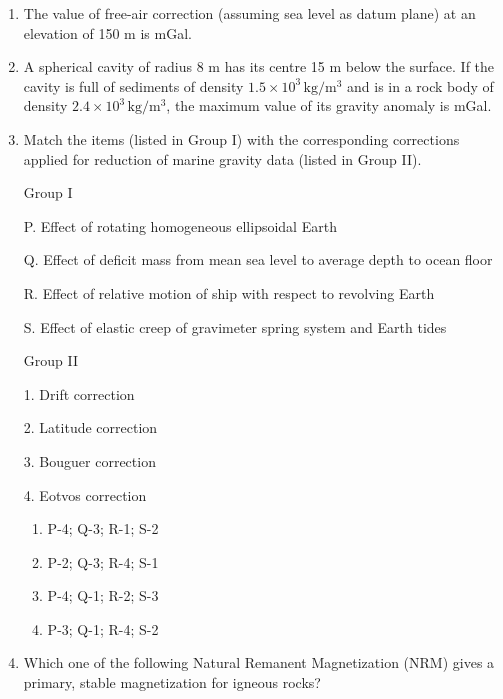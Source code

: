 \documentclass[journal,12pt,onecolumn]{IEEEtran}
\begin{document}
\begin{enumerate}
\begin{enumerate}
\item The value of free-air correction (assuming sea level as datum plane) at an elevation of 150 m is \underline{\hspace{3cm}} mGal.

\hfill{}

\item A spherical cavity of radius 8 m has its centre 15 m below the surface. If the cavity is full of sediments of density $1.5\times10^{3}\,\mathrm{kg/m^3}$ and is in a rock body of density $2.4\times10^{3}\,\mathrm{kg/m^3}$, the maximum value of its gravity anomaly is \underline{\hspace{3cm}} mGal.

\hfill{}

\item Match the items (listed in Group I) with the corresponding corrections applied for reduction of marine gravity data (listed in Group II).

\hfill{}

\noindent Group I

P. Effect of rotating homogeneous ellipsoidal Earth

Q. Effect of deficit mass from mean sea level to average depth to ocean floor

R. Effect of relative motion of ship with respect to revolving Earth

S. Effect of elastic creep of gravimeter spring system and Earth tides

\noindent Group II

1. Drift correction

2. Latitude correction

3. Bouguer correction

4. Eotvos correction

\begin{multicols}{2}
\begin{enumerate}[label=(\Alph*)]
\item P-4; Q-3; R-1; S-2
\item P-2; Q-3; R-4; S-1
\item P-4; Q-1; R-2; S-3
\item P-3; Q-1; R-4; S-2
\end{enumerate}
\end{multicols}

\item Which one of the following Natural Remanent Magnetization (NRM) gives a primary, stable magnetization for igneous rocks?


\end{enumerate}
\end{enumerate}
\end{document}
